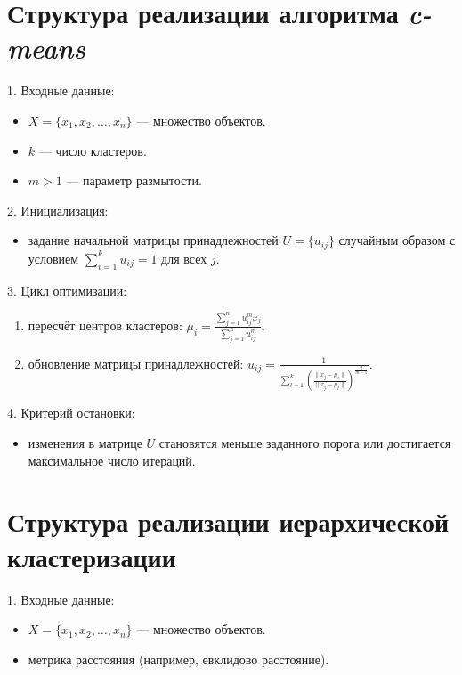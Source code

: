 \section{Структура реализации алгоритма \textit{c-means}}
1. Входные данные:
    \begin{itemize}
        \item $X = \{x_1, x_2, \ldots, x_n\}$ — множество объектов.
        \item $k$ — число кластеров.
        \item $m > 1$ — параметр размытости.
    \end{itemize}

2. Инициализация:
    \begin{itemize}
        \item задание начальной матрицы принадлежностей $U = \{u_{ij}\}$ случайным образом с условием $\sum_{i=1}^k u_{ij} = 1$ для всех $j$.
    \end{itemize}

3. Цикл оптимизации:
    \begin{enumerate}
        \item пересчёт центров кластеров:
        \begin{math}
        \mu_i = \frac{\sum_{j=1}^n u_{ij}^m x_j}{\sum_{j=1}^n u_{ij}^m}.
        \end{math}\cite{lib:cmeans}
        \item обновление матрицы принадлежностей:
        \begin{math}
        u_{ij} = \frac{1}{\sum_{l=1}^k \left(\frac{\|x_j - \mu_i\|}{\|x_j - \mu_l\|}\right)^{\frac{2}{m-1}}}.
        \end{math}\cite{lib:cmeans}
    \end{enumerate}

4. Критерий остановки:
    \begin{itemize}
        \item изменения в матрице $U$ становятся меньше заданного порога или достигается максимальное число итераций.
    \end{itemize}

\section{Структура реализации иерархической кластеризации}
1. Входные данные:
    \begin{itemize}
        \item $X = \{x_1, x_2, \ldots, x_n\}$ — множество объектов.
        \item метрика расстояния (например, евклидово расстояние).
    \end{itemize}

